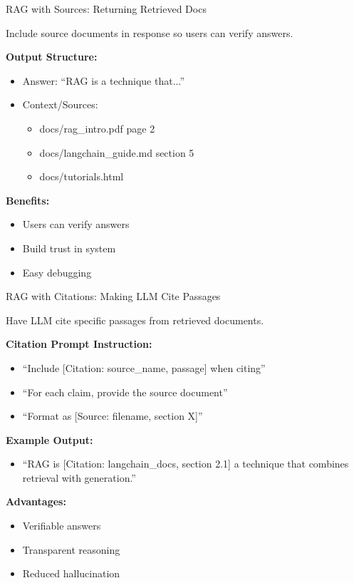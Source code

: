 \documentclass[aspectratio=169,11pt]{beamer}
\begin{document}
\begin{frame}{RAG with Sources: Returning Retrieved Docs}
  \begin{tipbox}[Transparency]
    Include source documents in response so users can verify answers.
  \end{tipbox}

  \textbf{Output Structure:}
  \begin{itemize}
    \setlength{\itemsep}{1pt}
    \item Answer: ``RAG is a technique that...''
    \item Context/Sources:
    \begin{itemize}
    \setlength{\itemsep}{1pt}
      \item docs/rag\_intro.pdf page 2
      \item docs/langchain\_guide.md section 5
      \item docs/tutorials.html
    \end{itemize}
  \end{itemize}

  \textbf{Benefits:}
  \begin{itemize}
    \setlength{\itemsep}{1pt}
    \item Users can verify answers
    \item Build trust in system
    \item Easy debugging
  \end{itemize}
\end{frame}

\begin{frame}{RAG with Citations: Making LLM Cite Passages}
  \begin{conceptbox}[Goal]
    Have LLM cite specific passages from retrieved documents.
  \end{conceptbox}

  \textbf{Citation Prompt Instruction:}
  \begin{itemize}
    \setlength{\itemsep}{1pt}
    \item ``Include [Citation: source\_name, passage] when citing''
    \item ``For each claim, provide the source document''
    \item ``Format as [Source: filename, section X]''
  \end{itemize}

  \textbf{Example Output:}
  \begin{itemize}
    \setlength{\itemsep}{1pt}
    \item ``RAG is [Citation: langchain\_docs, section 2.1] a technique that combines retrieval with generation.''
  \end{itemize}

  \textbf{Advantages:}
  \begin{itemize}
    \setlength{\itemsep}{1pt}
    \item Verifiable answers
    \item Transparent reasoning
    \item Reduced hallucination
  \end{itemize}
\end{frame}
\end{document}
